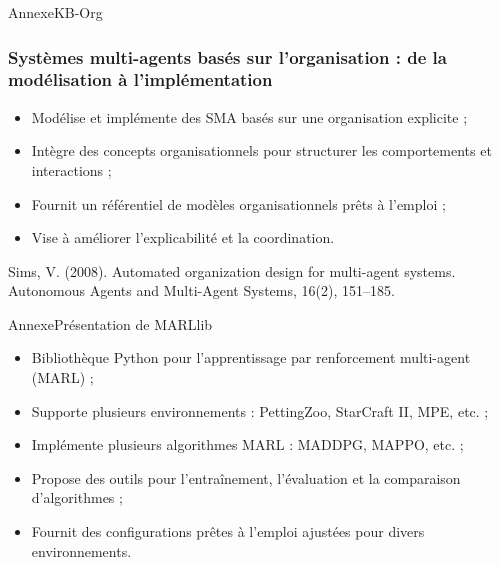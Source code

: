 \begin{frame}{Annexe}{KB-Org}
    \frametitle{Systèmes multi-agents basés sur l'organisation : de la modélisation à l'implémentation}

    \begin{itemize}
        \item Modélise et implémente des SMA basés sur une organisation explicite ;
        \item Intègre des concepts organisationnels pour structurer les comportements et interactions ;
        \item Fournit un référentiel de modèles organisationnels prêts à l'emploi ;
        \item Vise à améliorer l'explicabilité et la coordination.
    \end{itemize}

    \vspace{1em}
    Sims, V. (2008). Automated organization design for multi-agent systems. Autonomous Agents and Multi-Agent Systems, 16(2), 151–185.

\end{frame}

\begin{frame}{Annexe}{Présentation de MARLlib}

    \begin{itemize}
        \item Bibliothèque Python pour l’apprentissage par renforcement multi-agent (MARL) ;
        \item Supporte plusieurs environnements : PettingZoo, StarCraft II, MPE, etc. ;
        \item Implémente plusieurs algorithmes MARL : MADDPG, MAPPO, etc. ;
        \item Propose des outils pour l'entraînement, l’évaluation et la comparaison d’algorithmes ;
        \item Fournit des configurations prêtes à l’emploi ajustées pour divers environnements.
    \end{itemize}

\end{frame}

